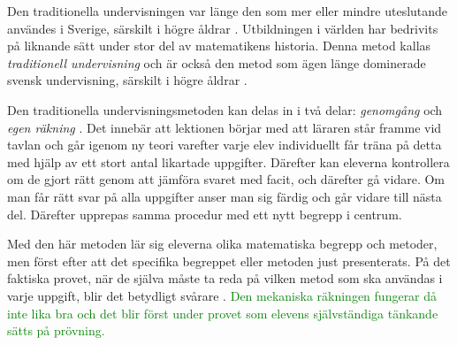 
\textcolor{lila}{Den traditionella undervisningen var länge den som mer eller mindre uteslutande användes i Sverige, särskilt i högre åldrar \cite{Namnaren}. Utbildningen i världen har bedrivits på liknande sätt under stor del av matematikens historia. Denna metod kallas \textsl{traditionell undervisning} och är också den metod som ägen länge dominerade svensk undervisning, särskilt i högre åldrar \cite{Namnaren}.}

\textcolor{lila}{Den traditionella undervisningsmetoden kan delas in i två delar: \textsl{genomgång} och \textsl{egen räkning} \cite{traditionellMatte}. Det innebär att lektionen börjar med att läraren står framme vid tavlan och går igenom ny teori varefter varje elev individuellt får träna på detta med hjälp av ett stort antal likartade uppgifter. Därefter kan eleverna kontrollera om de gjort rätt genom att jämföra svaret med facit, och därefter gå vidare. Om man får rätt svar på alla uppgifter anser man sig färdig och går vidare till nästa del. Därefter upprepas samma procedur med ett nytt begrepp i centrum.} 
    
\textcolor{lila}{Med den här metoden lär sig eleverna olika matematiska begrepp och metoder, men först efter att det specifika begreppet eller metoden just presenterats. På det faktiska provet, när de själva måste ta reda på vilken metod som ska användas i varje uppgift, blir det betydligt svårare \cite{TheElephant}.}
\textcolor{green}{
    Den mekaniska räkningen fungerar då inte lika bra och det blir först under provet som elevens självständiga tänkande sätts på prövning.}
    


